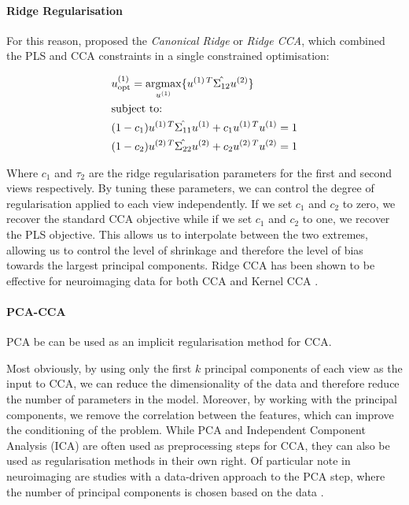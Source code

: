 \paragraph{Ridge Regularisation} For this reason, \citet{vinod1976canonical} proposed the \textit{Canonical Ridge} or \textit{Ridge CCA}, which combined the PLS and CCA constraints in a single constrained optimisation:

\begin{align}
    & u^{(1)}_{\text{opt}} = \underset{u^{(1)}}{\mathrm{argmax}} \{ u^{(1)\,T} \hat{\Sigma_{12}} u^{(2)} \} \\
    & \text{subject to:} \notag \\
    & (1 - c_1) u^{(1)\,T} \hat{\Sigma_{11}} u^{(1)} + c_1 u^{(1)\,T} u^{(1)} = 1 \notag \\
    & (1 - c_2) u^{(2)\,T} \hat{\Sigma_{22}} u^{(2)} + c_2 u^{(2)\,T} u^{(2)} = 1 \notag
\end{align}

Where $c_1$ and $\tau_2$ are the ridge regularisation parameters for the first and second views respectively.
By tuning these parameters, we can control the degree of regularisation applied to each view independently.
If we set $c_1$ and $c_2$ to zero, we recover the standard CCA objective while if we set $c_1$ and $c_2$ to one, we recover the PLS objective.
This allows us to interpolate between the two extremes, allowing us to control the level of shrinkage and therefore the level of bias towards the largest principal components. Ridge CCA has been shown to be effective for neuroimaging data for both CCA \citep{tenenhaus2011regularized, tuzhilina2023canonical, hardoon2004canonical} and Kernel CCA \citep{hardoon2007unsupervised}.

\paragraph{PCA-CCA} PCA be can be used as an implicit regularisation method for CCA.

Most obviously, by using only the first \( k \) principal components of each view as the input to CCA, we can reduce the dimensionality of the data and therefore reduce the number of parameters in the model.
Moreover, by working with the principal components, we remove the correlation between the features, which can improve the conditioning of the problem.
While PCA and Independent Component Analysis (ICA) are often used as preprocessing steps for CCA, they can also be used as regularisation methods in their own right.
Of particular note in neuroimaging are studies with a data-driven approach to the PCA step, where the number of principal components is chosen based on the data \citep{liu2022improved, mihalik_canonical_2022}.

